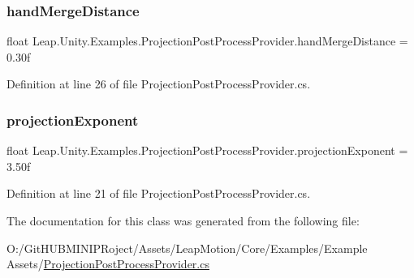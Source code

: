 \subsubsection{\texorpdfstring{handMergeDistance}{handMergeDistance}}
{\footnotesize\ttfamily float Leap.\+Unity.\+Examples.\+Projection\+Post\+Process\+Provider.\+hand\+Merge\+Distance = 0.\+30f}



Definition at line 26 of file Projection\+Post\+Process\+Provider.\+cs.

\mbox{\label{class_leap_1_1_unity_1_1_examples_1_1_projection_post_process_provider_ab20b11dc9cb64bb7e1dfdef74727a4e3}} 
\subsubsection{\texorpdfstring{projectionExponent}{projectionExponent}}
{\footnotesize\ttfamily float Leap.\+Unity.\+Examples.\+Projection\+Post\+Process\+Provider.\+projection\+Exponent = 3.\+50f}



Definition at line 21 of file Projection\+Post\+Process\+Provider.\+cs.



The documentation for this class was generated from the following file\+:\begin{DoxyCompactItemize}
\item 
O\+:/\+Git\+H\+U\+B\+M\+I\+N\+I\+P\+Roject/\+Assets/\+Leap\+Motion/\+Core/\+Examples/\+Example Assets/\mbox{\hyperlink{_projection_post_process_provider_8cs}{Projection\+Post\+Process\+Provider.\+cs}}\end{DoxyCompactItemize}
